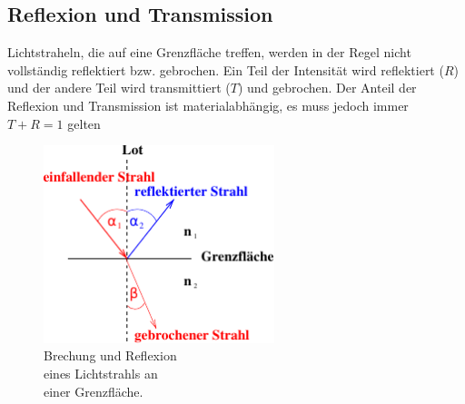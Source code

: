 \subsection{Reflexion und Transmission}
\label{subsec:R+T}
\begin{minipage}[t]{0,5\textwidth}
    Lichtstraheln, die auf eine Grenzfläche treffen, werden in der Regel nicht vollständig reflektiert bzw. gebrochen.
    Ein Teil der Intensität wird reflektiert ($R$) und der andere Teil wird transmittiert ($T$) und gebrochen.
    Der Anteil der Reflexion und Transmission ist materialabhängig, es muss jedoch immer $T + R = 1$ gelten
\end{minipage} 
\begin{minipage}[t]{0,5\textwidth}
    \begin{figure}[H]
        \centering
        \includegraphics[width=0.6\textwidth]{build/Abb_2c.pdf}
        \caption {Brechung und Reflexion\\eines Lichtstrahls an\\einer Grenzfläche\cite[2]{V400}.}
        \label{fig:Abb_1}
    \end{figure}

\end{minipage}   
